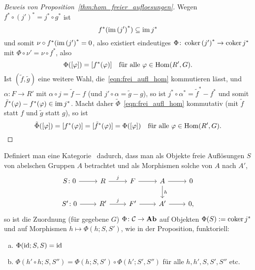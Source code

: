 \begin{proof}[Beweis von Proposition~\ref{thm:hom_freier_aufloesungen}]
  Wegen $f^* \circ {(j')}^* = j^* \circ g^*$ ist
  \begin{equation*}
    f^* (\operatorname{im} {(j')} ^*) \subseteq \operatorname{im} j^*
  \end{equation*}
  und somit $\nu \circ f^* (\operatorname{im} {(j')}^* = 0$, also existiert eindeutiges $\Phi \colon \operatorname{coker} {(j')}^* \to \operatorname{coker} j^*$ mit $\Phi \circ \nu' = \nu \circ f^*$, also
  \begin{equation*}
    \Phi([\varphi]) = [f^*(\varphi)] \quad \text{für alle $\varphi \in \mathrm{Hom}(R',G)$}.
  \end{equation*}
  Ist $(\tilde f, \tilde g)$ eine weitere Wahl, die~\eqref{eqn:frei_aufl_hom} kommutieren lässt, und $\alpha \colon F \to R'$ mit $\alpha \circ j = \tilde f - f$ (und $j' \circ \alpha = \tilde g - g$), so ist $j^* \circ \alpha^* = {\tilde f}^* - f^*$ und somit ${\tilde f}^* (\varphi) - f^*(\varphi) \in \operatorname{im} j^*$.
  Macht daher $\tilde\Phi$~\eqref{eqn:frei_aufl_hom} kommutativ (mit $\tilde f$ statt $f$ und $\tilde g$ statt $g$), so ist
  \begin{equation*}
    \tilde\Phi ([\varphi]) = [f^*(\varphi)] = [{\tilde f}^*(\varphi)] = \Phi ([\varphi]) \quad \text{für alle $\varphi \in \mathrm{Hom}(R',G)$}.
  \end{equation*}
\end{proof}
\begin{korollar}
  Definiert man eine Kategorie \C\ dadurch, dass man als Objekte freie Auflösungen $S$ von abelschen Gruppen $A$ betrachtet und als Morphismen solche von $A$ nach $A'$,
  \begin{equation*}
    \begin{tikzcd}
      S\colon 0 \arrow{r}{}  & R \arrow{r}{j}  & F \arrow{r}{} & A \arrow{d}{h}
                                                              \arrow{r}{}   & 0 \\
      S'\colon 0 \arrow{r}{}  & R'\arrow{r}{j}  & F'\arrow{r}{} & A'\arrow{r}{}   & 0,
    \end{tikzcd}
  \end{equation*}
  so ist die Zuordnung (für gegebene $G$) $\Phi \colon \mathcal{C} \to \mathbf{Ab}$ auf Objekten $\Phi(S) := \operatorname{coker} j^*$ und auf Morphismen $h \mapsto \Phi(h;S,S')$, wie in der Proposition, funktoriell:
  \begin{enumerate}[(a)]
    \item
      $\Phi(\operatorname{id};S,S) = \operatorname{id}$
    \item
      $\Phi(h' \circ h;S,S'') = \Phi(h;S,S') \circ \Phi(h';S',S'')$ für alle $h,h',S,S',S''$ etc.
    \end{enumerate}
\end{korollar}
